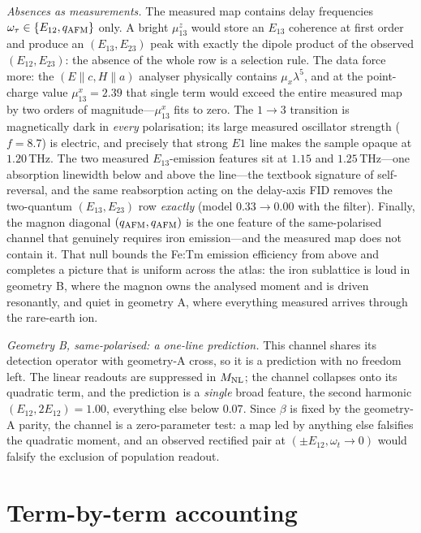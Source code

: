 \documentclass[aps,prb,twocolumn,superscriptaddress,longbibliography]{revtex4-2}
\newcommand{\qafm}{q_{\rm AFM}}
\newcommand{\Mnl}{M_{\rm NL}}
\begin{document}
\emph{Absences as measurements.}  The measured map contains delay
frequencies $\omega_\tau\in\{E_{12},\qafm\}$ only.  A bright
$\mu^z_{13}$ would store an $E_{13}$ coherence at first order and
produce an $(E_{13},E_{23})$ peak with exactly the dipole product of
the observed $(E_{12},E_{23})$: the absence of the whole row is a
selection rule.  The data force more: the
$(E\!\parallel\!c,H\!\parallel\!a)$ analyser physically contains
$\mu_x\lambda^5$, and at the point-charge value $\mu^x_{13}=2.39$
that single term would exceed the entire measured map by two orders
of magnitude---$\mu^x_{13}$ fits to zero.  The $1\!\to\!3$ transition
is magnetically dark in \emph{every} polarisation; its large measured
oscillator strength ($f=8.7$) is electric, and precisely that strong
$E1$ line makes the sample opaque at $1.20$\,THz.  The two measured
$E_{13}$-emission features sit at $1.15$ and $1.25$\,THz---one
absorption linewidth below and above the line---the textbook
signature of self-reversal, and the same reabsorption acting on the
delay-axis FID removes the two-quantum $(E_{13},E_{23})$ row
\emph{exactly} (model $0.33\to0.00$ with the filter).  Finally, the
magnon diagonal $(\qafm,\qafm)$ is the one feature of the
same-polarised channel that genuinely requires iron emission---and
the measured map does not contain it.  That null bounds the Fe:Tm
emission efficiency from above and completes a picture that is
uniform across the atlas: the iron sublattice is loud in geometry B,
where the magnon owns the analysed moment and is driven resonantly,
and quiet in geometry A, where everything measured arrives through
the rare-earth ion.

\emph{Geometry B, same-polarised: a one-line prediction.}  This
channel shares its detection operator with geometry-A cross, so it is
a prediction with no freedom left.  The linear readouts are
suppressed in $\Mnl$; the channel collapses onto its quadratic term,
and the prediction is a \emph{single} broad feature, the second
harmonic $(E_{12},2E_{12})=1.00$, everything else below $0.07$.
Since $\beta$ is fixed by the geometry-A parity, the channel is a
zero-parameter test: a map led by anything else falsifies the
quadratic moment, and an observed rectified pair at
$(\pm E_{12},\omega_t\to0)$ would falsify the exclusion of population
readout.

\section{Term-by-term accounting}
\label{sec:audit}
\end{document}
